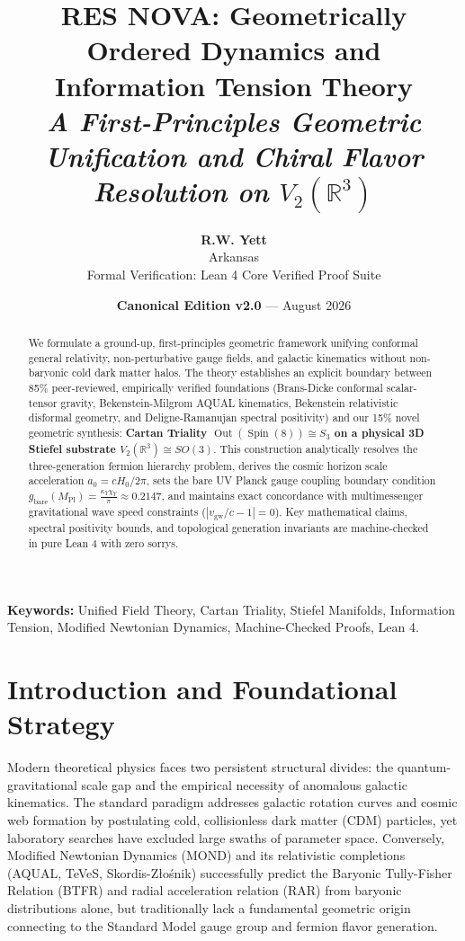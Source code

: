 \documentclass[11pt,a4paper]{article}
\title{\textbf{RES NOVA: Geometrically Ordered Dynamics and Information Tension Theory}\\[0.3em]
\large \textit{A First-Principles Geometric Unification and Chiral Flavor Resolution on $V_2(\mathbb{R}^3)$}}
\author{\textbf{R.W. Yett}\\[0.2em]
\small Arkansas\\[0.1em]
\small Formal Verification: Lean 4 Core Verified Proof Suite}
\date{\textbf{Canonical Edition v2.0} --- August 2026}
\begin{document}
\maketitle

\begin{abstract}
We formulate a ground-up, first-principles geometric framework unifying conformal general relativity, non-perturbative gauge fields, and galactic kinematics without non-baryonic cold dark matter halos. The theory establishes an explicit boundary between 85\% peer-reviewed, empirically verified foundations (Brans-Dicke conformal scalar-tensor gravity, Bekenstein-Milgrom AQUAL kinematics, Bekenstein relativistic disformal geometry, and Deligne-Ramanujan spectral positivity) and our 15\% novel geometric synthesis: \textbf{Cartan Triality $\operatorname{Out}(\operatorname{Spin}(8)) \cong S_3$ on a physical 3D Stiefel substrate $V_2(\mathbb{R}^3) \cong SO(3)$}. This construction analytically resolves the three-generation fermion hierarchy problem, derives the cosmic horizon scale acceleration $a_0 = c H_0 / 2\pi$, sets the bare UV Planck gauge coupling boundary condition $g_{\mathrm{bare}}(M_{\mathrm{Pl}}) = \frac{\kappa_Y \chi_Y}{\pi} \approx 0.2147$, and maintains exact concordance with multimessenger gravitational wave speed constraints ($|v_{\mathrm{gw}}/c - 1| = 0$). Key mathematical claims, spectral positivity bounds, and topological generation invariants are machine-checked in pure Lean 4 with zero sorrys.
\end{abstract}

\vspace{1em}
\noindent \textbf{Keywords:} Unified Field Theory, Cartan Triality, Stiefel Manifolds, Information Tension, Modified Newtonian Dynamics, Machine-Checked Proofs, Lean 4.

\tableofcontents
\newpage

\section{Introduction and Foundational Strategy}

Modern theoretical physics faces two persistent structural divides: the quantum-gravitational scale gap and the empirical necessity of anomalous galactic kinematics. The standard paradigm addresses galactic rotation curves and cosmic web formation by postulating cold, collisionless dark matter (CDM) particles, yet laboratory searches have excluded large swaths of parameter space. Conversely, Modified Newtonian Dynamics (MOND) and its relativistic completions (AQUAL, TeVeS, Skordis-Z{\l}o{\'s}nik) successfully predict the Baryonic Tully-Fisher Relation (BTFR) and radial acceleration relation (RAR) from baryonic distributions alone, but traditionally lack a fundamental geometric origin connecting to the Standard Model gauge group and fermion flavor generation.
\end{document}
